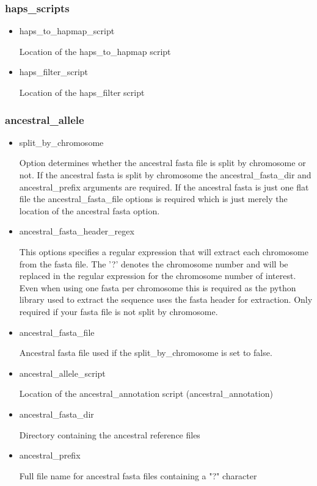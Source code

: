 \documentclass[a4paper,10pt]{article}
\begin{document}
\subsubsection{haps\_scripts}
\begin{itemize}
\item haps\_to\_hapmap\_script 

Location of the haps\_to\_hapmap script

\item haps\_filter\_script

Location of the haps\_filter script

\end{itemize}
\subsubsection{ancestral\_allele}
\begin{itemize}
\item split\_by\_chromosome

Option determines whether the ancestral fasta file is split by
chromosome or not. If the ancestral fasta is split by chromosome the
ancestral\_fasta\_dir and ancestral\_prefix arguments are required. If
the ancestral fasta is just one flat file the ancestral\_fasta\_file
options is required which is just merely the location of the ancestral
fasta option.

\item ancestral\_fasta\_header\_regex

This options specifies a regular expression that will extract each
chromosome from the fasta file. The '?' denotes the chromosome number
and will be replaced in the regular expression for the chromosome
number of interest. Even when using one fasta per chromosome this is
required as the python library used to extract the sequence uses the
fasta header for extraction. Only required if your fasta file is not
split by chromosome.

\item ancestral\_fasta\_file

Ancestral fasta file used if the split\_by\_chromosome is set to false.

\item ancestral\_allele\_script

Location of the ancestral\_annotation script (ancestral\_annotation)
\item ancestral\_fasta\_dir 

Directory containing the ancestral reference files
\item ancestral\_prefix 

Full file name for ancestral fasta files containing a "?" character

\end{itemize}
\end{document}
